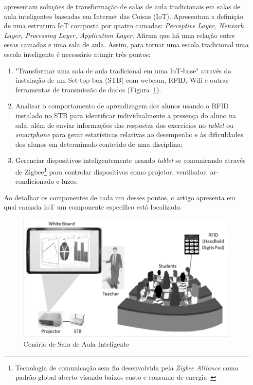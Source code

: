 \cite{Chang:2014} apresentam soluções de transformação de salas de aula tradicionais em salas de aula inteligentes baseadas em Internet das Coisas (IoT). Apresentam a definição de uma estrutura IoT composta por quatro camadas: \textit{Perceptive Layer, Network Layer, Processing Layer, Application Layer}. Afirma que há uma relação entre essas camadas e uma sala de aula. Assim, para tornar uma escola tradicional uma escola inteligente é necessário atingir três pontos:

\begin{enumerate}
   \item "Transformar uma sala de aula tradicional em uma IoT-base" através da instalação de um Set-top-box (STB) com webcam, RFID, Wifi e outras ferramentas de transmissão de dados (Figura~\ref{fig:chang2014}).
   \item Analisar o comportamento de aprendizagem dos alunos usando o RFID instalado no STB para identificar individualmente a presença do aluno na sala, além de enviar informações das respostas dos exercícios no \textit{tablet} ou \textit{smartphone} para gerar estatísticas relativas ao desempenho e às dificuldades dos alunos em determinado conteúdo de uma disciplina;
   \item Gerenciar dispositivos inteligentemente usando \textit{tablet} se comunicando através de Zigbee\footnote{Tecnologia de comunicação sem fio desenvolvida pela \textit{Zigbee Alliance} como padrão global aberto visando baixos custo e consumo de energia~\citep{Digi:2017}} para controlar dispositivos como projetor, ventilador, ar-condicionado e luzes.
\end{enumerate}

Ao detalhar os componentes de cada um desses pontos, o artigo apresenta em qual camada IoT um componente específico está localizado.

\begin{figure}[ht]
	\centering
	\includegraphics[width=0.8\linewidth]{imgs/Chang2014}
	\caption{Cenário de Sala de Aula Inteligente}
	\label{fig:chang2014}
\end{figure}

